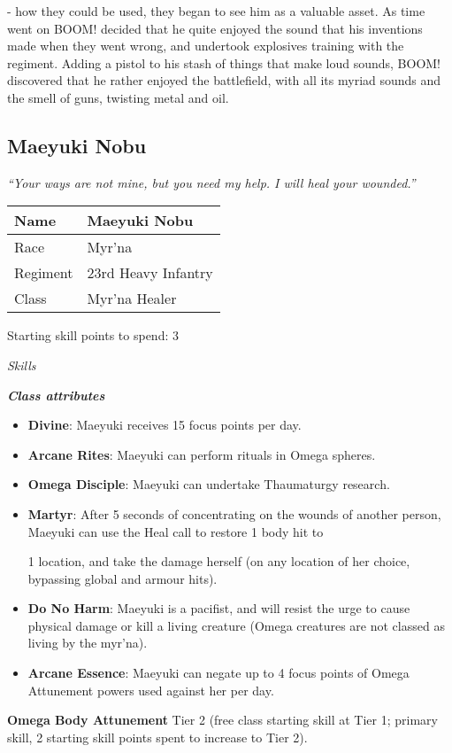 \documentclass{scrbook}
\begin{document}
- how they could be used, they began to see him as a valuable asset. As time went on BOOM! decided that he quite enjoyed the sound that his inventions made when they went wrong, and undertook explosives training with the regiment. Adding a pistol to his stash of things that make loud sounds, BOOM! discovered that he rather enjoyed the battlefield, with all its myriad sounds and the smell of guns, twisting metal and oil.

\subsection{Maeyuki Nobu}

\textit{``Your ways are not mine, but you need my help. I will heal your wounded.''}

\begin{table}
\begin{tabular}{|l|l|} \hline 
Name & Maeyuki Nobu \\
 \hline Race & Myr'na \\
 \hline Regiment & 23rd Heavy Infantry \\
 \hline Class & Myr'na Healer \\
 \hline \end{tabular}

\end{table}

Starting skill points to spend: 3

\textit{Skills}

\textbf{\textit{Class attributes}}

\begin{itemize}
\item \textbf{Divine}: Maeyuki receives 15 focus points per day.

\item \textbf{Arcane Rites}: Maeyuki can perform rituals in Omega spheres.

\item \textbf{Omega Disciple}: Maeyuki can undertake Thaumaturgy research.

\item \textbf{Martyr}: After 5 seconds of concentrating on the wounds of another person, Maeyuki can use the Heal call to restore 1 body hit to

1 location, and take the damage herself (on any location of her choice, bypassing global and armour hits).

\item \textbf{Do No Harm}: Maeyuki is a pacifist, and will resist the urge to cause physical damage or kill a living creature (Omega creatures are not classed as living by the myr'na).

\item \textbf{Arcane Essence}: Maeyuki can negate up to 4 focus points of Omega Attunement powers used against her per day.

\end{itemize}
\textbf{Omega Body Attunement} Tier 2 (free class starting skill at Tier 1; primary skill, 2 starting skill points spent to increase to Tier 2).
\end{document}
